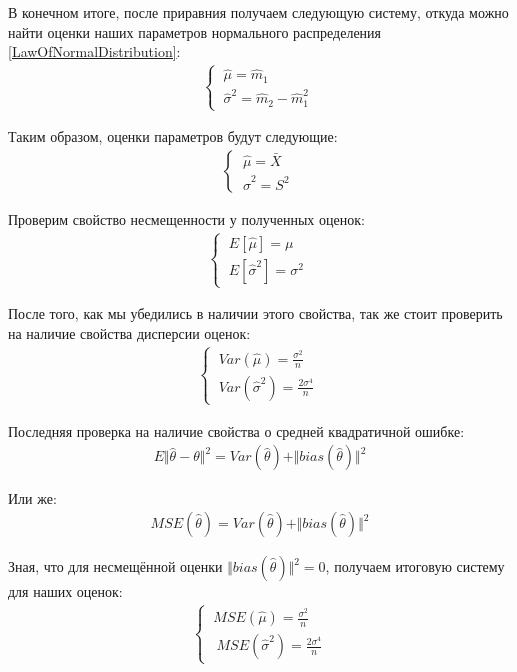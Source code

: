 \documentclass[12pt]{article}
\begin{document}
В конечном итоге, после приравния получаем следующую систему, откуда можно найти оценки наших параметров нормального распределения \eqref{LawOfNormalDistribution}:
\begin{gather*}
    \begin{cases}
    \ \hat{\mu} = \hat{m}_1 \\
    \ \hat{\sigma}^2 = \hat{m}_2 - \hat{m}_1^2\
    \end{cases}
    \label{FinalSystemOfEquations}
\end{gather*}
\newpage

Таким образом, оценки параметров будут следующие:
\begin{gather*}
    \begin{cases}
    \ \hat{\mu} = \bar{X} \\
    \ \hat{\sigma}^2 = S^2\
    \end{cases}
    \label{FinalSystemOfEquations}
\end{gather*}

Проверим свойство несмещенности у полученных оценок:
\begin{gather*}
    \begin{cases}
    \  E[\hat{\mu}] = \mu \\
    \ E[\hat{\sigma}^2] = \sigma^2\
    \end{cases}
\end{gather*}

После того, как мы убедились в наличии этого свойства, так же стоит проверить на наличие свойства дисперсии оценок:
\begin{gather*}
    \begin{cases}
    \ Var(\hat{\mu}) = \frac{\sigma^2}{n} \\
    \ Var(\hat{\sigma}^2) = \frac{2\sigma^4}{n}\
    \end{cases}
\end{gather*}

Последняя проверка на наличие свойства о средней квадратичной ошибке:
\begin{gather}
    \label{RootMeanSquareError1}
    \ E\Vert\hat{\theta} - \theta\Vert^2 = Var({\hat{\theta}}) + \Vert bias(\hat{\theta})\Vert^2\
\end{gather}

Или же:
\begin{gather}
    \label{RootMeanSquareError2}
    \ MSE(\hat{\theta}) = Var({\hat{\theta}}) + \Vert bias(\hat{\theta})\Vert^2\
\end{gather}

Зная, что для несмещённой оценки $\Vert bias(\hat{\theta})\Vert^2 = 0$, получаем итоговую систему для наших оценок:
\begin{gather*}
    \begin{cases}
        \ MSE(\hat{\mu}) = \frac{\sigma^2}{n} \\ \
        \ MSE(\hat{\sigma}^2) = \frac{2\sigma^4}{n}
    \end{cases}
\end{gather*}
\end{document}
